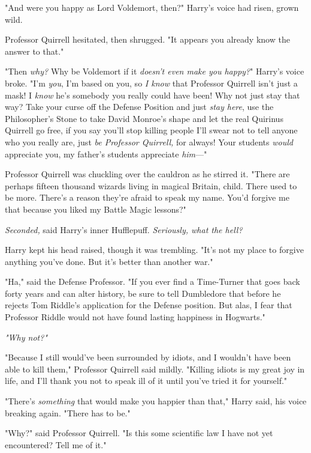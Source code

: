 "And were you happy as Lord Voldemort, then?" Harry's voice had risen, grown
wild.

Professor Quirrell hesitated, then shrugged. "It appears you already know the
answer to that."

"Then \emph{why?} Why be Voldemort if it \emph{doesn't even make you happy?}"
Harry's voice broke. "I'm \emph{you}, I'm based on you, so \emph{I know} that
Professor Quirrell isn't just a mask! I \emph{know} he's somebody you really
could have been! Why not just stay that way? Take your curse off the Defense
Position and just \emph{stay here}, use the Philosopher's Stone to take David
Monroe's shape and let the real Quirinus Quirrell go free, if you say you'll
stop killing people I'll swear not to tell anyone who you really are,
just \emph{be Professor Quirrell,} for always! Your students \emph{would}
appreciate you, my father's students appreciate \emph{him}\mbox{---}"

Professor Quirrell was chuckling over the cauldron as he stirred it. "There are
perhaps fifteen thousand wizards living in magical Britain, child. There used
to be more. There's a reason they're afraid to speak my name. You'd forgive me
that because you liked my Battle Magic lessons?"

\emph{Seconded,} said Harry's inner Hufflepuff. \emph{Seriously, what the hell?}

Harry kept his head raised, though it was trembling. "It's not my place to
forgive anything you've done. But it's better than another war."

"Ha," said the Defense Professor. "If you ever find a Time-Turner that goes
back forty years and can alter history, be sure to tell Dumbledore that before
he rejects Tom Riddle's application for the Defense position. But alas, I fear
that Professor Riddle would not have found lasting happiness in Hogwarts."

\emph{"Why not?"}

"Because I still would've been surrounded by idiots, and I wouldn't have been
able to kill them," Professor Quirrell said mildly. "Killing idiots is my great
joy in life, and I'll thank you not to speak ill of it until you've tried it
for yourself."

"There's \emph{something} that would make you happier than that," Harry said,
his voice breaking again. "There has to be."

"Why?" said Professor Quirrell. "Is this some scientific law I have not yet
encountered? Tell me of it."

